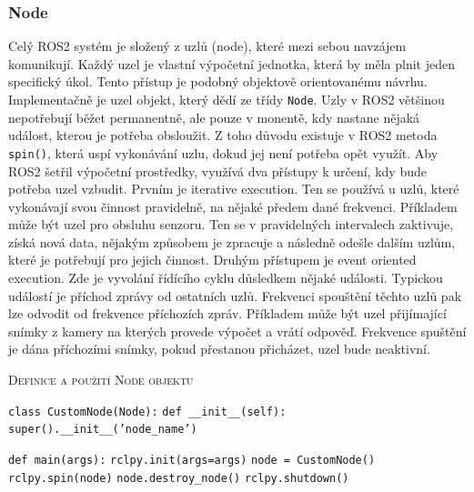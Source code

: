 \subsubsection*{Node}
Celý ROS2 systém je složený z uzlů (node), které mezi sebou navzájem komunikují. Každý uzel je vlastní výpočetní jednotka, která by měla plnit jeden specifický úkol. Tento přístup je podobný objektově orientovanému návrhu. Implementačně je uzel objekt, který dědí ze třídy \verb|Node|. \cite{ros2_documentation}
Uzly v ROS2 většinou nepotřebují běžet permanentně, ale pouze v monentě, kdy nastane nějaká událost, kterou je potřeba obsloužit. Z toho důvodu existuje v ROS2 metoda \verb|spin()|, která uspí vykonávání uzlu, dokud jej není potřeba opět využít. Aby ROS2 šetřil výpočetní prostředky, využívá dva přístupy k určení, kdy bude potřeba uzel vzbudit. Prvním je iterative execution. Ten se používá u uzlů, které vykonávají svou činnost pravidelně, na nějaké předem dané frekvenci. Příkladem může být uzel pro obsluhu senzoru. Ten se v pravidelných intervalech zaktivuje, získá nová data, nějakým způsobem je zpracuje a následně odešle dalším uzlům, které je potřebují pro jejich činnost.
Druhým přístupem je event oriented execution. Zde je vyvolání řídícího cyklu důsledkem nějaké události. Typickou událostí je příchod zprávy od ostatních uzlů. Frekvenci spouštění těchto uzlů pak lze odvodit od frekvence příchozích zpráv. Příkladem může být uzel přijímající snímky z kamery na kterých provede výpočet a vrátí odpověď. Frekvence spuštění je dána příchozími snímky, pokud přestanou přicházet, uzel bude neaktivní. \cite[str:~6]{ros2_introduction}

\begin{algorithm}[h!]
	\label{}
	\caption{\textsc{Definice a použití Node objektu}}
	
	\DontPrintSemicolon
	\SetAlgoNoLine
	\SetNlSty{}{}{:}
	\SetNlSkip{-1.1em}
	
	\BlankLine \Indp\Indpp
	
	\texttt{class CustomNode(Node):}\;
	\Indp\Indp
	\texttt{def \_\_init\_\_(self):}\;
	\Indp\Indp
	\texttt{super().\_\_init\_\_('node\_name')}\;
	\Indm\Indm\Indm\Indm
	
	\BlankLine
	
	\texttt{def main(args):}\;
	\Indp\Indp
	\texttt{rclpy.init(args=args)}\;
	\texttt{node = CustomNode()}\;
	\texttt{rclpy.spin(node)}\;
	\texttt{node.destroy\_node()}\;
	\texttt{rclpy.shutdown()}\;
\end{algorithm}

